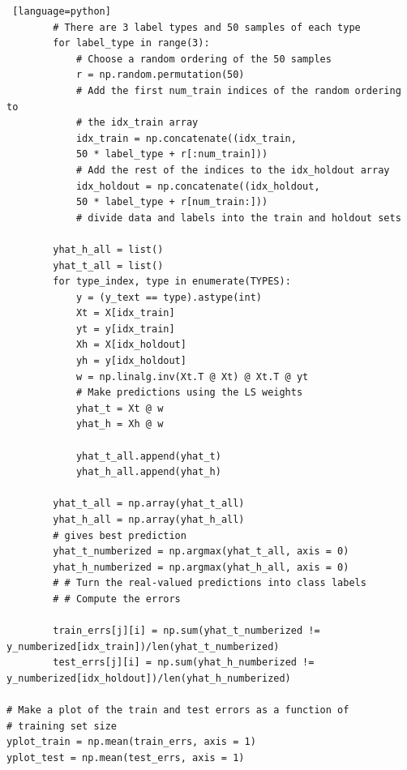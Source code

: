 \documentclass[a4paper, 12pt]{article}
\begin{document}
\begin{solution}
\begin{lstlisting} [language=python]
        # There are 3 label types and 50 samples of each type
        for label_type in range(3):
            # Choose a random ordering of the 50 samples
            r = np.random.permutation(50)
            # Add the first num_train indices of the random ordering to
            # the idx_train array
            idx_train = np.concatenate((idx_train,
            50 * label_type + r[:num_train]))
            # Add the rest of the indices to the idx_holdout array
            idx_holdout = np.concatenate((idx_holdout,
            50 * label_type + r[num_train:]))
            # divide data and labels into the train and holdout sets
        
        yhat_h_all = list()
        yhat_t_all = list()
        for type_index, type in enumerate(TYPES):
            y = (y_text == type).astype(int)
            Xt = X[idx_train]
            yt = y[idx_train]
            Xh = X[idx_holdout]
            yh = y[idx_holdout]
            w = np.linalg.inv(Xt.T @ Xt) @ Xt.T @ yt
            # Make predictions using the LS weights
            yhat_t = Xt @ w
            yhat_h = Xh @ w
            
            yhat_t_all.append(yhat_t)
            yhat_h_all.append(yhat_h)
        
        yhat_t_all = np.array(yhat_t_all)
        yhat_h_all = np.array(yhat_h_all)
        # gives best prediction
        yhat_t_numberized = np.argmax(yhat_t_all, axis = 0)
        yhat_h_numberized = np.argmax(yhat_h_all, axis = 0)
        # # Turn the real-valued predictions into class labels
        # # Compute the errors
        
        train_errs[j][i] = np.sum(yhat_t_numberized != y_numberized[idx_train])/len(yhat_t_numberized)
        test_errs[j][i] = np.sum(yhat_h_numberized != y_numberized[idx_holdout])/len(yhat_h_numberized)

# Make a plot of the train and test errors as a function of
# training set size
yplot_train = np.mean(train_errs, axis = 1)
yplot_test = np.mean(test_errs, axis = 1)


\end{lstlisting}
\end{solution}
\end{document}
